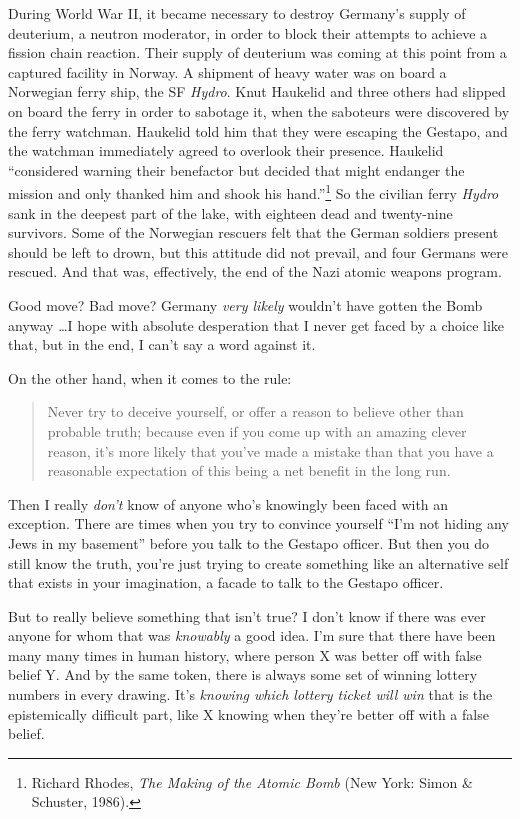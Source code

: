 {
 During World War II, it became necessary to destroy
Germany's supply of deuterium, a neutron moderator, in
order to block their attempts to achieve a fission chain reaction.
Their supply of deuterium was coming at this point from a captured
facility in Norway. A shipment of heavy water was on board a Norwegian
ferry ship, the SF \textit{Hydro}. Knut Haukelid and three others had
slipped on board the ferry in order to sabotage it, when the saboteurs
were discovered by the ferry watchman. Haukelid told him that they were
escaping the Gestapo, and the watchman immediately agreed to overlook
their presence. Haukelid ``considered warning their
benefactor but decided that might endanger the mission and only thanked
him and shook his hand.''\footnote{Richard Rhodes, \textit{The Making of the Atomic Bomb} (New
York: Simon \& Schuster, 1986).} So the
civilian ferry \textit{Hydro} sank in the deepest part of the lake,
with eighteen dead and twenty-nine survivors. Some of the Norwegian
rescuers felt that the German soldiers present should be left to drown,
but this attitude did not prevail, and four Germans were rescued. And
that was, effectively, the end of the Nazi atomic weapons program.}

{
 Good move? Bad move? Germany \textit{very likely}
wouldn't have gotten the Bomb anyway \ldots I hope with
absolute desperation that I never get faced by a choice like that, but
in the end, I can't say a word against it.}

{
 On the other hand, when it comes to the rule:}

\begin{quote}
{
 Never try to deceive yourself, or offer a reason to believe other
than probable truth; because even if you come up with an amazing clever
reason, it's more likely that you've
made a mistake than that you have a reasonable expectation of this
being a net benefit in the long run.}
\end{quote}

{
 Then I really \textit{don't} know of anyone
who's knowingly been faced with an exception. There are
times when you try to convince yourself
``I'm not hiding any Jews in my
basement'' before you talk to the Gestapo officer.
But then you do still know the truth, you're just
trying to create something like an alternative self that exists in your
imagination, a facade to talk to the Gestapo officer.}

{
 But to really believe something that isn't true? I
don't know if there was ever anyone for whom that was
\textit{knowably} a good idea. I'm sure that there have
been many many times in human history, where person X was better off
with false belief Y. And by the same token, there is always some set of
winning lottery numbers in every drawing. It's
\textit{knowing which lottery ticket will win} that is the
epistemically difficult part, like X knowing when
they're better off with a false belief.}

